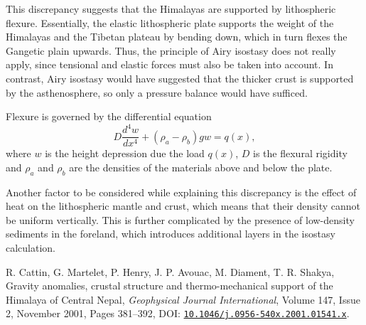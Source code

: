 \documentclass[10pt]{article}
\begin{document}
        This discrepancy suggests that the Himalayas are supported by lithospheric flexure.
        Essentially, the elastic lithospheric plate supports the weight of the Himalayas and the Tibetan plateau by bending down, which in turn
        flexes the Gangetic plain upwards.
        Thus, the principle of Airy isostasy does not really apply, since tensional and elastic forces must also be taken into account.
        In contrast, Airy isostasy would have suggested that the thicker crust is supported by the asthenosphere, so only a pressure balance would
        have sufficed.

        Flexure is governed by the differential equation
        \[
                D\frac{d^4w}{dx^4} + (\rho_{a} - \rho_{b})gw = q(x),
        \]
        where $w$ is the height depression due the load $q(x)$, $D$ is the flexural rigidity and $\rho_{a}$ and $\rho_{b}$ are the densities
        of the materials above and below the plate.

        Another factor to be considered while explaining this discrepancy is the effect of heat on the lithospheric mantle and crust,
        which means that their density cannot be uniform vertically.
        This is further complicated by the presence of low-density sediments in the foreland, which introduces additional layers in the isostasy
        calculation.

        \begin{thebibliography}{9}
        R. Cattin, G. Martelet, P. Henry, J. P. Avouac, M. Diament, T. R. Shakya,
        Gravity anomalies, crustal structure and thermo-mechanical support of the Himalaya of Central Nepal,
        \textit{Geophysical Journal International}, Volume 147, Issue 2, November 2001, Pages 381--392,
        \textsc{\small DOI:} \texttt{\href{https://doi.org/10.1046/j.0956-540x.2001.01541.x}{10.1046/j.0956-540x.2001.01541.x}}.
        \end{thebibliography}
\end{document}
